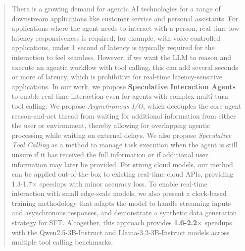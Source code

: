 
\begin{abstract}

There is a growing demand for agentic AI technologies for a range of downstream applications like customer service and personal assistants.
For applications where the agent needs to interact with a person, real-time low-latency responsiveness is required;
for example, with voice-controlled applications, under 1 second of latency is typically required for the interaction to feel seamless.
However, if we want the LLM to reason and execute an agentic workflow with tool calling, this can add several seconds or more of latency, which is prohibitive for real-time latency-sensitive applications.
In our work, we propose \textbf{Speculative Interaction Agents} to enable real-time interaction even for agents with complex multi-turn tool calling. 
We propose \textit{Asynchronous I/O}, which decouples the core agent reason-and-act thread from waiting for additional information from either the user or environment, thereby allowing for overlapping agentic processing while waiting on external delays.
We also propose \textit{Speculative Tool Calling} as a method to manage task execution when the agent is still unsure if it has received the full information or if additional user information may later be provided.
For strong cloud models, our method can be applied out-of-the-box to existing real-time cloud APIs, providing 1.3-1.7$\times$ speedups with minor accuracy loss.
To enable real-time interaction with small edge-scale models, we also present a clock-based training methodology that adapts the model to handle streaming inputs and asynchronous responses, and demonstrate a synthetic data generation strategy for SFT.
Altogether, this approach provides \textbf{1.6-2.2}$\times$ speedups with the Qwen2.5-3B-Instruct and Llama-3.2-3B-Instruct models across multiple tool calling benchmarks. 

\end{abstract}